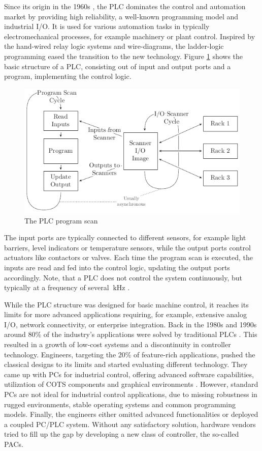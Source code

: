 Since its origin in the 1960s \citep{par99}, the \ac{PLC} dominates the
control and automation market by providing high reliability, a well-known
programming model and industrial I/O. It is used for various automation tasks
in typically electromechanical processes, for example machinery or plant
control. Inspired by the hand-wired relay logic systems and wire-diagrams, the
ladder-logic programming eased the transition to the new technology. Figure
\ref{fig:plc} shows the basic structure of a \ac{PLC}, consisting out of input
and output ports and a program, implementing the control logic.
\begin{figure}[tb]
	\centering
	\includegraphics{../figures/plc}
	\caption{The \acs{PLC} program scan \citep[adapted from][]{par99}}
	\label{fig:plc}
\end{figure}
The input ports are typically connected to different sensors, for example
light barriers, level indicators or temperature sensors, while the output
ports control actuators like contactors or valves. Each time the program scan
is executed, the inputs are read and fed into the control logic, updating the
output ports accordingly. Note, that a \ac{PLC} does not control the system
continuously, but typically at a frequency of several $\SI{}{\kilo\hertz}$
\citep{par99}.

While the \ac{PLC} structure was designed for basic machine control, it
reaches its limits for more advanced applications requiring, for example,
extensive analog I/O, network connectivity, or enterprise integration. Back in
the 1980s and 1990s around 80\% of the industry's applications were solved by
traditional \acp{PLC} \citep{bel05}. This resulted in a growth of low-cost
systems and a discontinuity in controller technology. Engineers, targeting the
20\% of feature-rich applications, pushed the classical designs to its limits
and started evaluating different technology. They came up with \acp{PC} for
industrial control, offering advanced software capabilities, utilization of
\ac{COTS} components and graphical environments \citep{bel05}. However,
standard \acp{PC} are not ideal for industrial control applications, due to
missing robustness in rugged environments, stable operating systems and common
programming models. Finally, the engineers either omitted advanced
functionalities or deployed a coupled \ac{PC}/\ac{PLC} system. Without any
satisfactory solution, hardware vendors tried to fill up the gap by developing
a new class of controller, the so-called \acp{PAC}.

